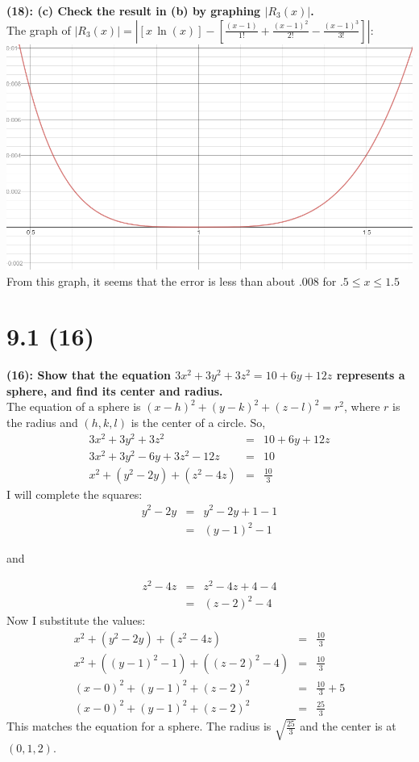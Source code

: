 \documentclass[12]{article}
\begin{document}
\textbf{(18): (c) Check the result in (b) by graphing $|R_3(x)|$.}\\

The graph of $\displaystyle{
|R_3(x)| = \left|[x\,\ln{(x)}] - \left[\frac{(x-1)}{1!} + \frac{(x-1)^2}{2!} - \frac{(x-1)^3}{3!}\right]
\right|}$:\\
\includegraphics[scale=.5]{R_3(x).png}\\
From this graph, it seems that the error is less than about .008 for 
$.5 \leq x \leq 1.5$


\section{9.1 (16)}
\textbf{(16): Show that the equation 
$3x^2 + 3y^2 + 3z^2 = 10 + 6y + 12z$ represents a sphere, and find its center and radius.
}\\

The equation of a sphere is $(x-h)^2+(y-k)^2+(z-l)^2=r^2$, where $r$ is the radius and $(h,k,l)$ is the center of a circle. So,
\begin{eqnarray}
3x^2 + 3y^2 + 3z^2 &=& 10 +6y + 12z\\
3x^2 + 3y^2 - 6y + 3z^2 - 12z &=& 10\\
x^2 + (y^2 - 2y) + (z^2 -4z) &=& \frac{10}{3}
\end{eqnarray}
I will complete the squares:\begin{eqnarray}
y^2 - 2y &=& y^2 -2y +1 - 1\\
&=& (y-1)^2-1
\end{eqnarray}
\begin{center}and\end{center}
\begin{eqnarray}
z^2-4z &=& z^2-4z + 4 - 4\\
&=& (z-2)^2 -4
\end{eqnarray}
Now I substitute the values:
\begin{eqnarray}
x^2 + (y^2 - 2y) + (z^2 - 4z) &=& \frac{10}{3}\\
x^2 + ((y-1)^2 - 1) + ((z-2)^2 -4) &=& \frac{10}{3}\\
(x-0)^2 + (y-1)^2 + (z-2)^2 &=& \frac{10}{3} + 5\\
(x-0)^2 + (y-1)^2 + (z-2)^2 &=& \frac{25}{3}
\end{eqnarray}
This matches the equation for a sphere. The radius is $\displaystyle{\sqrt{\frac{25}{3}}}$ and the center is at $(0,1,2)$.
\end{document}
